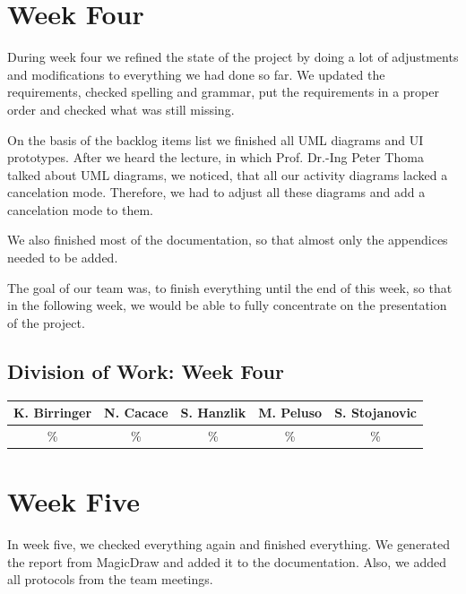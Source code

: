 \documentclass[a4paper, 12pt]{article}
\begin{document}
\section{Week Four}
During week four we refined the state of the project by doing a lot of adjustments and modifications to everything we had done so far.
We updated the requirements, checked spelling and grammar, put the requirements in a proper order and checked what was still missing.

On the basis of the backlog items list we finished all UML diagrams and UI prototypes.
After we heard the lecture, in which Prof. Dr.-Ing Peter Thoma talked about UML diagrams, we  noticed, that all our activity diagrams lacked a cancelation mode. Therefore, we had to adjust all these diagrams and add a cancelation mode to them. 

We also finished most of the documentation, so that almost only the appendices needed to be added.

The goal of our team was, to finish everything until the end of this week, so that in the following week, we would be able to fully concentrate on the presentation of the project.

\subsection{Division of Work: Week Four}

\begin{table}[htbp]
\centering
\setlength{\tabcolsep}{10pt}
\begin{tabular}{|c|c|c|c|c|}
\hline
K. Birringer & N. Cacace & S. Hanzlik & M. Peluso & S. Stojanovic\\
\hline
\% & \% & \% & \% & \% \\ 
\hline
\end{tabular}
\end{table}

\section{Week Five}
In week five, we checked everything again and finished everything.
We generated the report from MagicDraw and added it to the documentation.
Also, we added all protocols from the team meetings.
\end{document}
